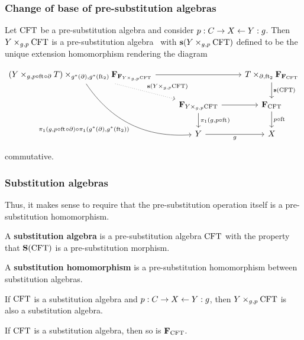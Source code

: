 \documentclass{beamer}
\newcommand\important[1]{\textbf{\color{red!90!black}#1}}
\begin{document}
\begin{frame}
\frametitle{\bf Change of base of pre-substitution algebras}
\begin{theorem}
Let $\mathrm{CFT}$ be a pre-substitution algebra and consider
$p:C\rightarrow X\leftarrow Y:g$. Then
$\cobesys{Y}{\stesys}{g}{p}$ is a pre-substitution algebra
\pause~with $\mathbf{s}(\cobesys{Y}{\stesys}{g}{p})$ defined
to be the unique extension homomorphism rendering the diagram
\begin{footnotesize}
\begin{equation*}
\begin{tikzcd}[ampersand replacement=\&]
\cobesys
  {\pullback{Y}{\stesyst}{g}{p\circ\eft\circ\ebd}}
  {\famesys{\famesys{\cobesys{Y}{\stesys}{g}{p}}}}
  {g^\ast(\ebd)}{g^\ast(\eft[2])}
  \ar[dotted]{dr}{\mathbf{s}(\cobesys{Y}{\stesys}{g}{p})}
  \ar{rr}
  \ar[bend right]{ddr}[swap]%
    { \pullbackpr{1}{g}{p\circ\eft\circ\ebd}%
        \circ%
      \pullbackpr{1}{g^\ast(\ebd)}{g^\ast(\eft[2])}%
      }
  \&
  {}\&
\cobesys{\stesyst}{\famesys{\famesys{\stesys}}}{\ebd}{\eft[2]}
  \ar{d}{\mathbf{s}(\stesys)}
  \\
  {}\&
\famesys{\cobesys{Y}{\stesys}{g}{p}}
  \ar{r}
  \ar{d}{\pullbackpr{1}{g}{p\circ\eft}}
  \&
\famesys{\stesys}
  \ar{d}{p\circ\eft}
  \\
  {}\&
Y
  \ar{r}[swap]{g}
  \&
X
\end{tikzcd}
\end{equation*}
\end{footnotesize}
commutative. 
\end{theorem}
\end{frame}

\begin{frame}
\frametitle{\bf Substitution algebras}
Thus, it makes sense to require that the pre-substitution operation itself is a
pre-substitution homomorphism.
\begin{definition}
A \important{substitution algebra} is a pre-substitution algebra $\mathrm{CFT}$ with the property that
$\mathbf{S}(\mathrm{CFT})$ is a pre-substitution morphism.
\end{definition}
\pause
\begin{definition}
A \important{substitution homomorphism} is a pre-substitution homomorphism between substitution
algebras.
\end{definition}
\pause
\begin{theorem}
If $\mathrm{CFT}$ is a substitution algebra and $p:C\rightarrow X\leftarrow Y:g$,
then $\cobesys{Y}{\stesys}{g}{p}$ is also a substitution algebra.
\end{theorem}
\pause
\begin{theorem}
If $\mathrm{CFT}$ is a substitution algebra, then so is $\mathbf{F}_{\mathrm{CFT}}$. 
\end{theorem}
\end{frame}
\end{document}
